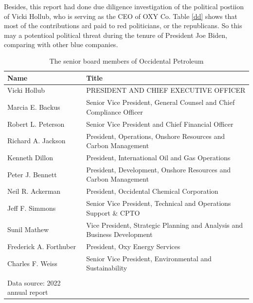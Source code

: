 \documentclass[
	a4paper, %
	12pt,%
]{CSSullivanBusinessReport}
\begin{document}
\begin{fullwidth}
\par
Besides, this report had done due diligence investigation of the political postiion of Vicki Hollub, who is serving as the CEO of OXY Co. Table \ref{dd} shows that most of the contributions ard paid to red politicians, or the republicans. So this may a potentioal political threat during the tenure of President Joe Biden, comparing with other blue companies.
\begin{table}[!ht]\footnotesize
    \centering
    \caption{The senior board members of Occidental Petroleum}
    \begin{tabular}{ll}
    \hline
        Name & Title  \\ \hline
        Vicki Hollub & PRESIDENT AND CHIEF EXECUTIVE OFFICER  \\ 
        Marcia E. Backus & Senior Vice President, General Counsel and Chief Compliance Officer  \\ 
        Robert L. Peterson & Senior Vice President and Chief Financial Officer  \\ 
        Richard A. Jackson & President, Operations, Onshore Resources and Carbon Management  \\ 
        Kenneth Dillon  &  President, International Oil and Gas Operations  \\ 
        Peter J. Bennett  &  President, Development, Onshore Resources and Carbon Management  \\ 
        Neil R. Ackerman  &  President, Occidental Chemical Corporation  \\ 
        Jeff F. Simmons  &  Senior Vice President, Technical and Operations Support \& CPTO  \\ 
        Sunil Mathew  &  Vice President, Strategic Planning and Analysis and Business Development  \\ 
        Frederick A. Forthuber  &  President, Oxy Energy Services  \\ 
        Charles F. Weiss  &  Senior Vice President, Environmental and Sustainability  \\ \hline
        \\Data source: 2022 annual report
    \end{tabular}

\end{table}


\end{fullwidth}
\end{document}
